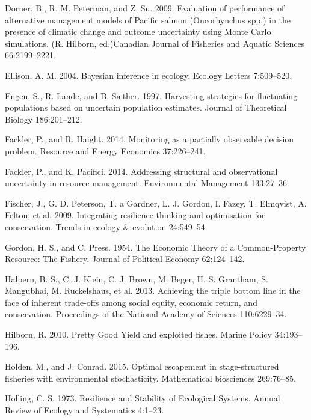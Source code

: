 \documentclass[3p]{elsarticle} %
\begin{document}
\leavevmode\hypertarget{ref-Dorner2009}{}%
Dorner, B., R. M. Peterman, and Z. Su. 2009. Evaluation of performance
of alternative management models of Pacific salmon (Oncorhynchus spp.)
in the presence of climatic change and outcome uncertainty using Monte
Carlo simulations. (R. Hilborn, ed.)Canadian Journal of Fisheries and
Aquatic Sciences 66:2199--2221.

\leavevmode\hypertarget{ref-Ellison2004}{}%
Ellison, A. M. 2004. Bayesian inference in ecology. Ecology Letters
7:509--520.

\leavevmode\hypertarget{ref-Engen1997}{}%
Engen, S., R. Lande, and B. Sæther. 1997. Harvesting strategies for
fluctuating populations based on uncertain population estimates. Journal
of Theoretical Biology 186:201--212.

\leavevmode\hypertarget{ref-Fackler2014b}{}%
Fackler, P., and R. Haight. 2014. Monitoring as a partially observable
decision problem. Resource and Energy Economics 37:226--241.

\leavevmode\hypertarget{ref-Fackler2014}{}%
Fackler, P., and K. Pacifici. 2014. Addressing structural and
observational uncertainty in resource management. Environmental
Management 133:27--36.

\leavevmode\hypertarget{ref-Fischer2009}{}%
Fischer, J., G. D. Peterson, T. a Gardner, L. J. Gordon, I. Fazey, T.
Elmqvist, A. Felton, et al. 2009. Integrating resilience thinking and
optimisation for conservation. Trends in ecology \& evolution
24:549--54.

\leavevmode\hypertarget{ref-Gordon1954}{}%
Gordon, H. S., and C. Press. 1954. The Economic Theory of a
Common-Property Resource: The Fishery. Journal of Political Economy
62:124--142.

\leavevmode\hypertarget{ref-Halpern2013}{}%
Halpern, B. S., C. J. Klein, C. J. Brown, M. Beger, H. S. Grantham, S.
Mangubhai, M. Ruckelshaus, et al. 2013. Achieving the triple bottom line
in the face of inherent trade-offs among social equity, economic return,
and conservation. Proceedings of the National Academy of Sciences
110:6229--34.

\leavevmode\hypertarget{ref-Hilborn2010}{}%
Hilborn, R. 2010. Pretty Good Yield and exploited fishes. Marine Policy
34:193--196.

\leavevmode\hypertarget{ref-Holden2015}{}%
Holden, M., and J. Conrad. 2015. Optimal escapement in stage-structured
fisheries with environmental stochasticity. Mathematical biosciences
269:76--85.

\leavevmode\hypertarget{ref-Holling1973}{}%
Holling, C. S. 1973. Resilience and Stability of Ecological Systems.
Annual Review of Ecology and Systematics 4:1--23.
\end{document}
